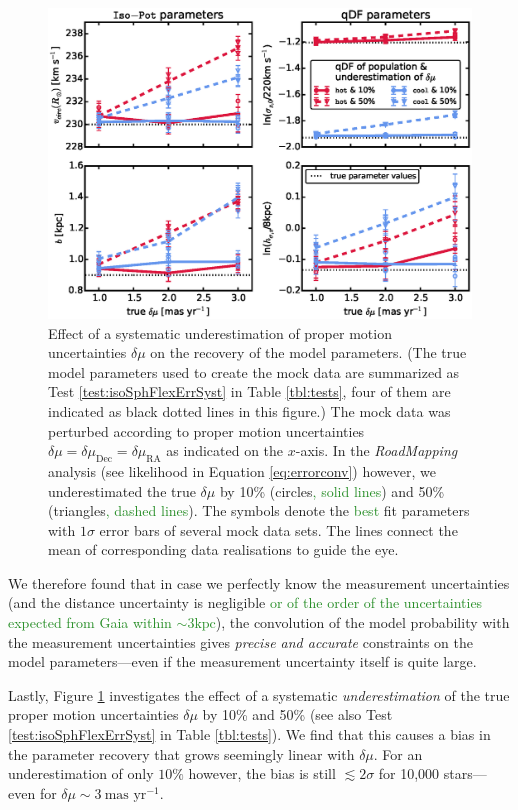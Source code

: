 \documentclass[iop,revtex4]{emulateapj}
\newcommand{\RM}{{\sl RoadMapping}}
\newcommand{\NEW}[1]{\textcolor{ForestGreen}{#1}}
\newcommand{\OLD}[1]{}
\begin{document}
\begin{figure}[!htbp]
\centering
\includegraphics[width=\columnwidth]{figs/isoSphFlexErrSyst_offset_vs_error.eps}
\caption{Effect of a systematic underestimation of proper motion uncertainties $\delta \mu$ on the recovery of the model parameters. (The true model parameters used to create the mock data are summarized as Test \ref{test:isoSphFlexErrSyst} in Table \ref{tbl:tests}, four of them are indicated as black dotted lines in this figure.) The mock data was perturbed according to proper motion uncertainties $\delta \mu = \delta \mu_\text{Dec} = \delta \mu_\text{RA}$ as indicated on the $x$-axis. In the \RM{} analysis (see likelihood in Equation \eqref{eq:errorconv}) however, we underestimated the true $\delta \mu$ by 10\% (circles\NEW{, solid lines}) and 50\% (triangles\NEW{, dashed lines}). The symbols denote the \OLD{pest}\NEW{best} fit parameters with $1\sigma$ error bars of several mock data sets. The lines connect the mean of corresponding data realisations to guide the eye.}
\label{fig:isoSphFlexErrSyst}
\end{figure}

We therefore found that in case we perfectly know the measurement uncertainties (and the distance uncertainty is negligible \NEW{or of the order of the uncertainties expected from Gaia within $\sim3\text{kpc}$}), the convolution of the model probability with the measurement uncertainties gives \emph{precise and accurate} constraints on the model parameters---even if the measurement uncertainty itself is quite large.

Lastly, Figure \ref{fig:isoSphFlexErrSyst} investigates the effect of a systematic \emph{underestimation} of the true proper motion uncertainties $\delta \mu$ by 10\% and 50\% (see also Test \ref{test:isoSphFlexErrSyst} in Table \ref{tbl:tests}). We find that this causes a bias in the parameter recovery that grows seemingly linear with $\delta \mu$. For an underestimation of only $10\%$ however, the bias is still $\lesssim 2 \sigma$ for 10,000 stars---even for $\delta \mu \sim 3~\text{mas yr}^{-1}$.
\end{document}
